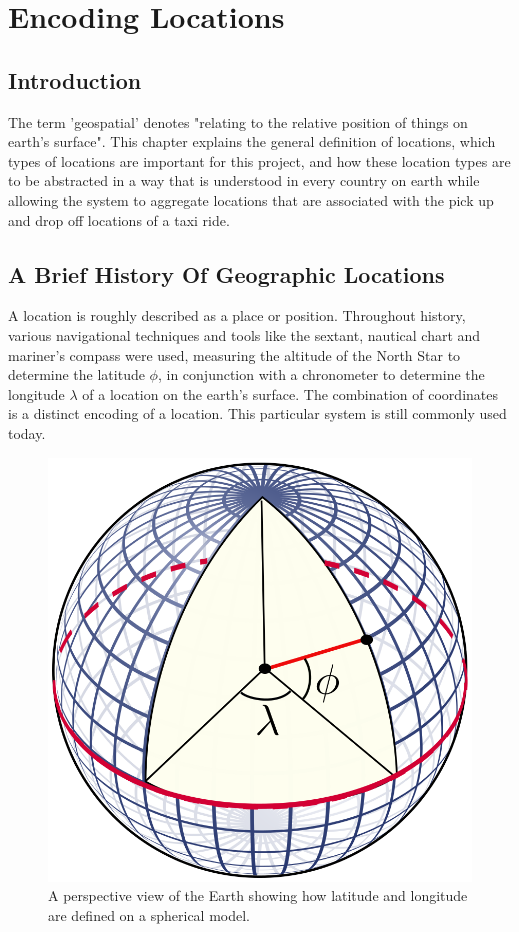 \graphicspath{{Chapter2/Figs/Vector/}{Chapter2/Figs/}}

%
\chapter{Encoding Locations}
\section{Introduction}
The term 'geospatial' denotes "relating to the relative position of things on earth's surface". This chapter explains the general definition of locations, which types of locations are important for this project, and how these location types are to be abstracted in a way that is understood in every country on earth while allowing the system to aggregate locations that are associated with the pick up and drop off locations of a taxi ride.

%
\section{A Brief History Of Geographic Locations}
A location is roughly described as a place or position. Throughout history, various navigational techniques and tools like the sextant, nautical chart and mariner's compass were used, measuring the altitude of the North Star to determine the latitude $\phi$, in conjunction with a chronometer to determine the longitude $\lambda$ of a location on the earth's surface. The combination of coordinates is a distinct encoding of a location. This particular system is still commonly used today.

\begin{figure}[htbp!]
	\centering
	\includegraphics[width=.2\textwidth]{LatLngSphere}
	\caption[LatLngSphere]{A perspective view of the Earth showing how latitude and longitude are defined on a spherical model.}
	\label{fig:latlngsphere}
\end{figure}


